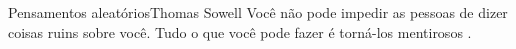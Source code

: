 \begin{FraseOutros}{Pensamentos aleatórios}{Thomas Sowell} %
Você não pode impedir as pessoas de dizer coisas ruins sobre você. 
Tudo o que você pode fazer é torná-los mentirosos 
\cite{sowell1999barbarians}.
\end{FraseOutros}

